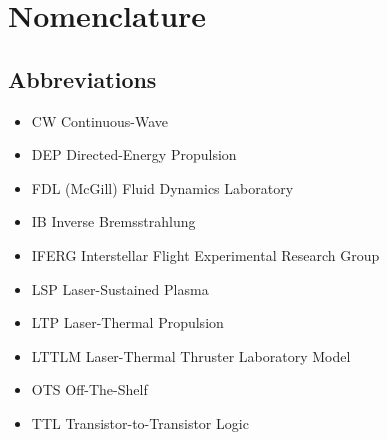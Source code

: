 \chapter*{Nomenclature}
\setlength{\columnsep}{1cm}
\newenvironment{nomtable}
    {
        \centering
        \tabularx{\columnwidth}{r>{\raggedright\arraybackslash}X}
    }
    {
        \endtabularx
    }
\newenvironment{nomlist}
    {
        \begin{itemize}[leftmargin=1.5cm]
            \raggedright
            \setlength{\parsep}{0pt}
            \setlength{\itemsep}{-4pt}
    }
    {
        \end{itemize}
    }
\begin{multicols}{2}
    \section*{Abbreviations}

    \begin{nomlist}
        \item[CW]               Continuous-Wave
        \item[DEP]              Directed-Energy Propulsion
        \item[FDL]              (McGill) Fluid Dynamics Laboratory
        \item[IB]               Inverse Bremsstrahlung 
        \item[IFERG]            Interstellar Flight Experimental Research Group
        \item[LSP]              Laser-Sustained Plasma
        \item[LTP]              Laser-Thermal Propulsion
        \item[LTTLM]            Laser-Thermal Thruster Laboratory Model
        \item[OTS]              Off-The-Shelf
        \item[TTL]              Transistor-to-Transistor Logic
    \end{nomlist}


\end{multicols}
